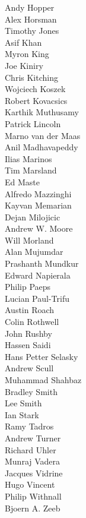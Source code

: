 \begin{small}
\begin{autogrid}{4}
Andy Hopper \\
Alex Horsman \\
Timothy Jones \\
Asif Khan \\
Myron King \\
Joe Kiniry \\
Chris Kitching \\
Wojciech Koszek \\
Robert Kovacsics \\
Karthik Muthusamy \\
Patrick Lincoln \\
Marno van der Maas \\
Anil Madhavapeddy \\
Ilias Marinos \\
Tim Marsland \\
Ed Maste \\
Alfredo Mazzinghi \\
Kayvan Memarian \\
Dejan Milojicic \\
Andrew W. Moore \\
Will Morland \\
Alan Mujumdar \\
Prashanth Mundkur \\
Edward Napierala \\
Philip Paeps \\
Lucian Paul-Trifu \\
Austin Roach \\
Colin Rothwell \\
John Rushby \\
Hassen Saidi \\
Hans Petter Selasky \\
Andrew Scull \\
Muhammad Shahbaz \\
Bradley Smith \\
Lee Smith \\
Ian Stark \\
Ramy Tadros \\
Andrew Turner \\
Richard Uhler \\
Munraj Vadera \\
Jacques Vidrine \\
Hugo Vincent \\
Philip Withnall \\
Bjoern A. Zeeb \\
\end{autogrid}
\end{small}

